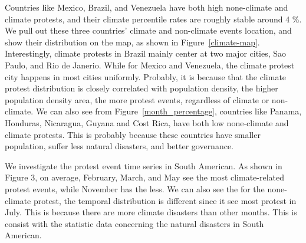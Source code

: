 \documentclass[9pt,twocolumn,twoside]{pnas-new}
\begin{document}
Countries like Mexico, Brazil, and Venezuela have both high none-climate and climate protests, and their climate percentile rates are roughly stable around 4 \%.
We pull out these three countries' climate and non-climate events location, and show their distribution on the map, as shown in Figure~\ref{climate-map}. Interestingly, climate protests in Brazil mainly center at two major cities, Sao Paulo, and Rio de Janerio. While for Mexico and Venezuela, the climate protest city happens in most cities uniformly. Probably, it is because that the climate protest distribution is closely correlated with population density, the higher population density area, the more protest events, regardless of climate or non-climate. We can also see from Figure~\ref{month_percentage}, countries like Panama, Honduras, Nicaragua, Guyana and Cost Rica, have both low none-climate and climate protests. This is probably because these countries have smaller population, suffer less natural disasters, and better governance.


We investigate the protest event time series in South American. As shown in Figure 3, on average, February, March, and May see the most climate-related protest events, while November has the less. We can also see the for the none-climate protest, the temporal distribution is different since it see most protest in July. This is because there are more climate disasters than other months. This is consist with the statistic data concerning the natural disasters in South American.
\end{document}
